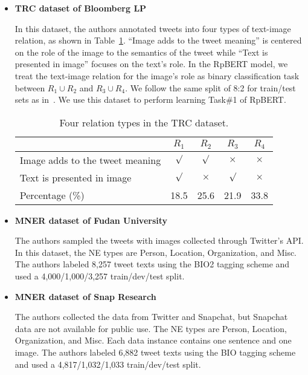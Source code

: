 \documentclass[letterpaper]{article} \usepackage{aaai21}  \usepackage{times}  \usepackage{helvet} \usepackage{courier}  \usepackage[hyphens]{url}  \usepackage{graphicx} \urlstyle{rm} \def\UrlFont{\rm}  \usepackage{natbib}  \usepackage{caption} \frenchspacing  \setlength{\pdfpagewidth}{8.5in}  \setlength{\pdfpageheight}{11in}
\begin{document}
\begin{itemize}




\item \textbf{TRC dataset of Bloomberg LP~\cite{vempala2019categorizing}}

In this dataset, the authors annotated tweets into four types of text-image relation, as shown in Table~\ref{tab:bloomberg}.
``Image adds to the tweet meaning'' is centered on the role of the image to the semantics of the tweet while ``Text is presented in image'' focuses on the text’s role.
In the RpBERT model, we treat the  text-image relation for the image’s role as binary classification task between $R_1 \cup R_2$ and $R_3 \cup R_4$.
We follow the same split of 8:2 for train/test sets as in~\cite{vempala2019categorizing}.
We use this dataset to perform learning Task\#1  of  RpBERT.



\begin{table}[htb]
\small
\centering
\begin{tabular}{|l|cccc|} 
  \hline
& $R_1$ & $R_2$   &$R_3$ & 	$R_4$	\\
\hline


				Image adds to the tweet meaning				& $\surd$ & $\surd$ & $\times$& $\times$\\
					Text is presented in image			& $\surd$  & $\times$  & $\surd$ &$\times$ \\
					 Percentage (\%) 			& 18.5  &  25.6& 21.9 & 33.8\\
\hline
\end{tabular}
\caption{Four relation types  in the TRC dataset.}\label{tab:bloomberg}
\end{table}


\item \textbf{MNER dataset of Fudan University~\cite{zhang2018adaptive} }

The authors sampled the tweets with images collected through Twitter’s API.
In this dataset, the NE types are Person, Location, Organization, and Misc.
The authors labeled 8,257 tweet texts using the BIO2 tagging scheme and used a 4,000/1,000/3,257 train/dev/test split.

\item \textbf{MNER  dataset of Snap Research~\cite{lu2018visual}}

The authors collected the data from Twitter and Snapchat, but Snapchat data are not available for public use.
The NE types are Person, Location, Organization, and Misc.
Each data instance contains one sentence and one image.
The authors labeled 6,882 tweet texts using the BIO tagging scheme and used a 4,817/1,032/1,033 train/dev/test split.

\end{itemize}
\end{document}
